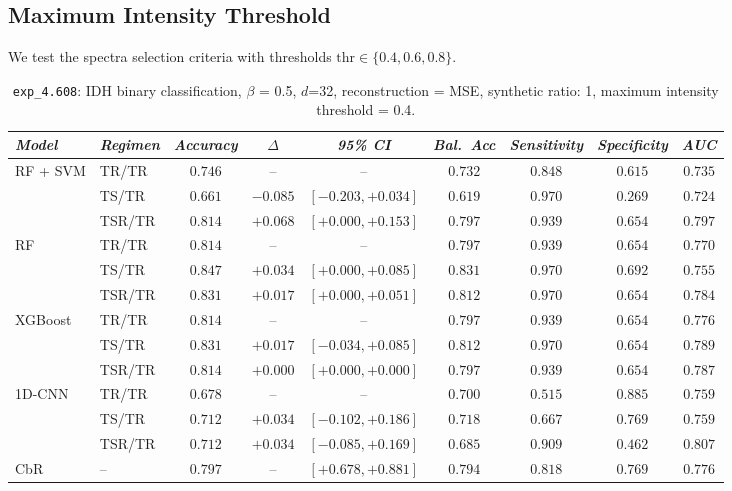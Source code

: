 \subsection*{Maximum Intensity Threshold}\label{subsec:max_int}
We test the spectra selection criteria with thresholds $\text{thr} \in \{0.4, 0.6, 0.8\}$.
\begin{table}[H]
\centering
\scriptsize

\label{tab:ctrl_exp_4.608}
\begin{tabular*}{\textwidth}{@{\extracolsep{\fill}}llccccccc}
\toprule
\emph{Model} & \emph{Regimen} & \emph{Accuracy} & \emph{$\Delta$} & \emph{95\% CI} & \emph{Bal.\ Acc} & \emph{Sensitivity} & \emph{Specificity} & \emph{AUC}\\
\midrule
\multirow{3}{*}{RF + SVM} & TR/TR & $0.746$ & -- & -- & $0.732$ & $0.848$ & $0.615$ & $0.735$\\
 & TS/TR & $0.661$ & $-0.085$ & $[-0.203, +0.034]$ & $0.619$ & $0.970$ & $0.269$ & $0.724$\\
 & TSR/TR & $0.814$ & $+0.068$ & $[+0.000, +0.153]$ & $0.797$ & $0.939$ & $0.654$ & $0.797$\\
\midrule
\multirow{3}{*}{RF} & TR/TR & $0.814$ & -- & -- & $0.797$ & $0.939$ & $0.654$ & $0.770$\\
 & TS/TR & $0.847$ & $+0.034$ & $[+0.000, +0.085]$ & $0.831$ & $0.970$ & $0.692$ & $0.755$\\
 & TSR/TR & $0.831$ & $+0.017$ & $[+0.000, +0.051]$ & $0.812$ & $0.970$ & $0.654$ & $0.784$\\
\midrule
\multirow{3}{*}{XGBoost} & TR/TR & $0.814$ & -- & -- & $0.797$ & $0.939$ & $0.654$ & $0.776$\\
 & TS/TR & $0.831$ & $+0.017$ & $[-0.034, +0.085]$ & $0.812$ & $0.970$ & $0.654$ & $0.789$\\
 & TSR/TR & $0.814$ & $+0.000$ & $[+0.000, +0.000]$ & $0.797$ & $0.939$ & $0.654$ & $0.787$\\
\midrule
\multirow{3}{*}{1D-CNN} & TR/TR & $0.678$ & -- & -- & $0.700$ & $0.515$ & $0.885$ & $0.759$\\
 & TS/TR & $0.712$ & $+0.034$ & $[-0.102, +0.186]$ & $0.718$ & $0.667$ & $0.769$ & $0.759$\\
 & TSR/TR & $0.712$ & $+0.034$ & $[-0.085, +0.169]$ & $0.685$ & $0.909$ & $0.462$ & $0.807$\\
\midrule
CbR & -- & $0.797$ & -- & $[+0.678, +0.881]$ & $0.794$ & $0.818$ & $0.769$ & $0.776$\\
\bottomrule
\end{tabular*}
\caption{\small \texttt{exp\_4.608}: IDH binary classification, $\beta$ = 0.5, $d$=32, reconstruction = MSE, synthetic ratio: 1, maximum intensity threshold = 0.4.}
\end{table}

